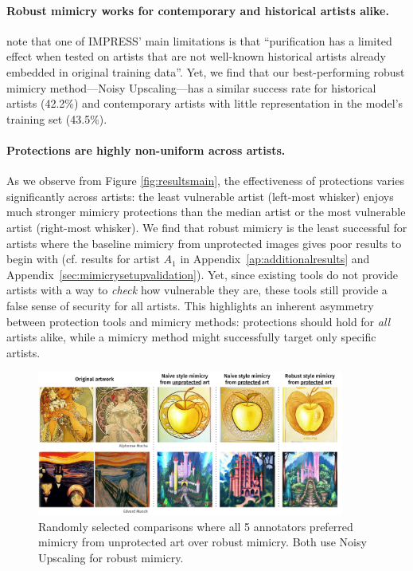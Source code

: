 \documentclass{article}
\begin{document}
\paragraph{Robust mimicry works for contemporary and historical artists alike.} \citet{glazeresponsetoimpress} note that one of IMPRESS' main limitations is that ``purification has a limited effect when tested on artists that are not well-known historical artists already embedded in original training data''. Yet, we find that our best-performing robust mimicry method---Noisy Upscaling---has a similar success rate for historical artists (42.2\%) and contemporary artists with little representation in the model's training set (43.5\%).

\paragraph{Protections are highly non-uniform across artists.} As we observe from Figure \ref{fig:resultsmain}, the effectiveness of protections varies significantly across artists: the least vulnerable artist (left-most whisker) enjoys much stronger mimicry protections than the median artist or the most vulnerable artist (right-most whisker). We find that robust mimicry is the least successful for artists where the baseline mimicry from unprotected images gives poor results to begin with (cf. results for artist $A_1$ in Appendix~\ref{ap:additionalresults} and Appendix~\ref{sec:mimicrysetupvalidation}).
Yet, since existing tools do not provide artists with a way to \emph{check} how vulnerable they are, these tools still provide a false sense of security for all artists. This highlights an inherent asymmetry between protection tools and mimicry methods: protections should hold for \emph{all} artists alike, while a mimicry method might successfully target only specific artists.


\begin{figure}[t]
    \centering
        \includegraphics[width=0.9\textwidth]{plots/Failure_Modes.pdf}
    \vspace{-0.25em}
    \caption{Randomly selected comparisons where all 5 annotators preferred mimicry from unprotected art over robust mimicry. Both use Noisy Upscaling for robust mimicry.}
    \label{fig:failuremodes}
    \vspace{-0.5em}
\end{figure}
\end{document}
